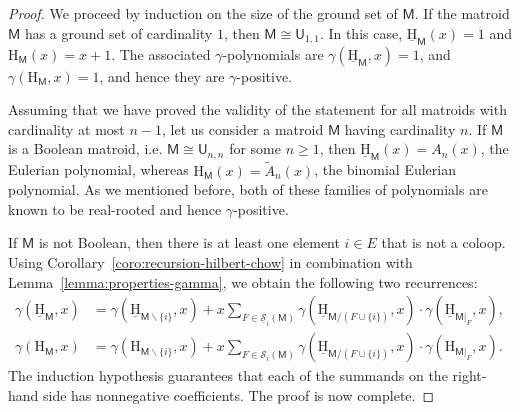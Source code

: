 \documentclass[11pt, a4paper, english]{amsart}
\theoremstyle{teoremas}
\theoremstyle{definition}
\newcommand{\M}{\mathsf{M}}
\newcommand{\U}{\mathsf{U}}
\renewcommand{\H}{\mathrm{H}}
\newcommand{\uH}{\underline{\mathrm{H}}}
\begin{document}
\begin{proof}
    We proceed by induction on the size of the ground set of $\M$. If the matroid $\M$ has a ground set of cardinality $1$, then $\M\cong \U_{1,1}$. In this case, $\uH_{\M}(x) = 1$ and $\H_{\M}(x)=x+1$. The associated $\gamma$-polynomials are $\gamma(\uH_{\M},x) = 1$, and $\gamma(\H_{\M},x) = 1$, and hence they are $\gamma$-positive. 
    
    Assuming that we have proved the validity of the statement for all matroids with cardinality at most $n-1$, let us consider a matroid $\M$ having cardinality $n$. If $\M$ is a Boolean matroid, i.e. $\M \cong \U_{n,n}$ for some $n\geq 1$, then $\uH_{\M}(x) = A_n(x)$, the Eulerian polynomial, whereas $\H_{\M}(x) = \widetilde{A}_n(x)$, the binomial Eulerian polynomial. As we mentioned before, both of these families of polynomials are known to be real-rooted and hence $\gamma$-positive.
    
    If $\M$ is not Boolean, then there is at least one element $i\in E$ that is not a coloop. Using Corollary~\ref{coro:recursion-hilbert-chow} in combination with Lemma~\ref{lemma:properties-gamma}, we obtain the following two recurrences:
    \begin{align*}
        \gamma(\uH_{\M},x) &= \gamma(\uH_{\M\smallsetminus\{i\}},x) + x \sum_{F\in \underline{\mathscr{S}}_i(\M)} \gamma(\uH_{\M/{(F\cup\{i\})}},x) \cdot \gamma(\uH_{\M|_F},x),\\
        \gamma(\H_{\M},x) &= \gamma(\H_{\M\smallsetminus\{i\}},x) + x \sum_{F\in \mathscr{S}_i(\M)} \gamma(\uH_{\M/{(F\cup\{i\})}},x) \cdot \gamma(\H_{\M|_F},x).
    \end{align*}
    The induction hypothesis guarantees that each of the summands on the right-hand side has nonnegative coefficients. The proof is now complete.
\end{proof}

\end{document}
